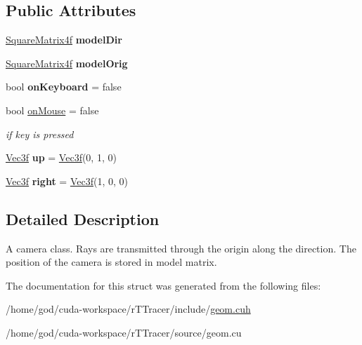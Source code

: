 \subsection*{Public Attributes}
\begin{DoxyCompactItemize}
\item 
\hyperlink{class_square_matrix4}{Square\+Matrix4f} {\bfseries model\+Dir}\hypertarget{struct_camera_aca61ca4fe4b4822de05bdc0881648dc5}{}\label{struct_camera_aca61ca4fe4b4822de05bdc0881648dc5}

\item 
\hyperlink{class_square_matrix4}{Square\+Matrix4f} {\bfseries model\+Orig}\hypertarget{struct_camera_ad8d667d7e8292ddef386fee085f981dd}{}\label{struct_camera_ad8d667d7e8292ddef386fee085f981dd}

\item 
bool {\bfseries on\+Keyboard} = false\hypertarget{struct_camera_ad0c8d1b86ab1589f62827e69336265c9}{}\label{struct_camera_ad0c8d1b86ab1589f62827e69336265c9}

\item 
bool \hyperlink{struct_camera_ac8c147911753dc1cf3a7a2b8219011c4}{on\+Mouse} = false\hypertarget{struct_camera_ac8c147911753dc1cf3a7a2b8219011c4}{}\label{struct_camera_ac8c147911753dc1cf3a7a2b8219011c4}

\begin{DoxyCompactList}\small\item\em if key is pressed \end{DoxyCompactList}\item 
\hyperlink{class_vec3}{Vec3f} {\bfseries up} = \hyperlink{class_vec3}{Vec3f}(0, 1, 0)\hypertarget{struct_camera_ace6326d21c5f4e8aad4314a99839bafd}{}\label{struct_camera_ace6326d21c5f4e8aad4314a99839bafd}

\item 
\hyperlink{class_vec3}{Vec3f} {\bfseries right} = \hyperlink{class_vec3}{Vec3f}(1, 0, 0)\hypertarget{struct_camera_a382a2d324a00da22f61d5694e3ba535e}{}\label{struct_camera_a382a2d324a00da22f61d5694e3ba535e}

\end{DoxyCompactItemize}


\subsection{Detailed Description}
A camera class. Rays are transmitted through the origin along the direction. The position of the camera is stored in model matrix. 

The documentation for this struct was generated from the following files\+:\begin{DoxyCompactItemize}
\item 
/home/god/cuda-\/workspace/r\+T\+Tracer/include/\hyperlink{geom_8cuh}{geom.\+cuh}\item 
/home/god/cuda-\/workspace/r\+T\+Tracer/source/geom.\+cu\end{DoxyCompactItemize}
